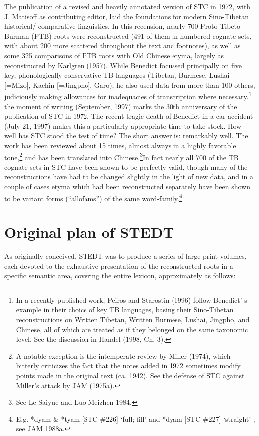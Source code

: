 The publication of a revised and heavily annotated version of STC in 1972, with J. Matisoff as contributing editor, laid the foundations for modern Sino-Tibetan historical/ comparative linguistics. In this recension, nearly 700 Proto-Tibeto-Burman (PTB) roots were reconstructed (491 of them in numbered cognate sets, with about 200 more scattered throughout the text and footnotes), as well as some 325 comparisons of PTB roots with Old Chinese etyma, largely as reconstructed by Karlgren (1957). While Benedict focussed principally on five key, phonologically conservative TB languages (Tibetan, Burmese, Lushai [=Mizo], Kachin [=Jingpho], Garo), he also used data from more than 100 others, judiciously making allowances for inadequacies of transcription where necessary.\footnote{In a recently published work, Peiros and Starostin (1996) follow Benedict' s example in their choice of key TB languages, basing their Sino-Tibetan reconstructions on Written Tibetan, Written Burmese, Lushai, Jingpho, and Chinese, all of which are treated as if they belonged on the same taxonomic level. See the discussion in Handel (1998, Ch. 3).} the moment of writing (September, 1997) marks the 30th anniversary of the publication of STC in 1972. The recent tragic death of Benedict in a car accident (July 21, 1997) makes this a particularly appropriate time to take stock. How well has STC stood the test of time? The short answer is: remarkably well. The work has been reviewed about 15 times, almost always in a highly favorable tone,\footnote{A notable exception is the intemperate review by Miller (1974), which bitterly criticizes the fact that the notes added in 1972 sometimes modify points made in the original text (ca. 1942). See the defense of STC against Miller's attack by JAM (1975a).} and has been translated into Chinese.\footnote{See Le Saiyue and Luo Meizhen 1984.}In fact nearly all 700 of the TB cognate sets in STC have been shown to be perfectly valid, though many of the reconstructions have had to be changed slightly in the light of new data, and in a couple of cases etyma which had been reconstructed separately have been shown to be variant forms (``allofams'') of the same word-family.\footnote{E.g. *dyam & *tyam [STC $\#$226] `full; fill' and *dyam [STC $\#$227] `straight' ; see JAM 1988a.}

\section{Original plan of STEDT}
As originally conceived, STEDT was to produce a series of large
print volumes, each devoted to the exhaustive presentation of the reconstructed
roots in a specific semantic area, covering the entire lexicon, approximately as
follows:

